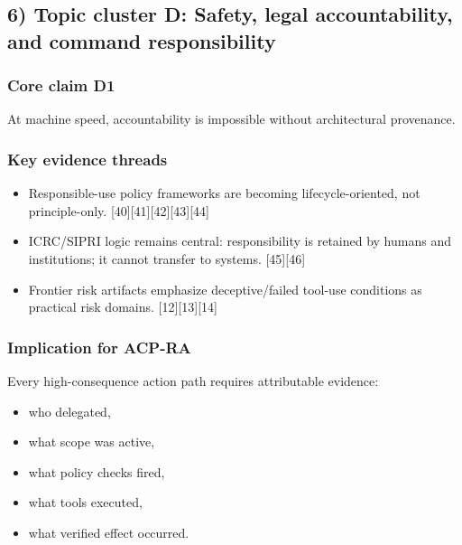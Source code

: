 \documentclass[11pt]{article}
\begin{document}
\hypertarget{topic-cluster-d-safety-legal-accountability-and-command-responsibility}{%
\subsection{6) Topic cluster D: Safety, legal accountability, and
command
responsibility}\label{topic-cluster-d-safety-legal-accountability-and-command-responsibility}}

\hypertarget{core-claim-d1}{%
\subsubsection{Core claim D1}\label{core-claim-d1}}

At machine speed, accountability is impossible without architectural
provenance.

\hypertarget{key-evidence-threads-3}{%
\subsubsection{Key evidence threads}\label{key-evidence-threads-3}}

\begin{itemize}
\tightlist
\item
  Responsible-use policy frameworks are becoming lifecycle-oriented, not
  principle-only. {[}40{]}{[}41{]}{[}42{]}{[}43{]}{[}44{]}
\item
  ICRC/SIPRI logic remains central: responsibility is retained by humans
  and institutions; it cannot transfer to systems. {[}45{]}{[}46{]}
\item
  Frontier risk artifacts emphasize deceptive/failed tool-use conditions
  as practical risk domains. {[}12{]}{[}13{]}{[}14{]}
\end{itemize}

\hypertarget{implication-for-acp-ra-3}{%
\subsubsection{Implication for ACP-RA}\label{implication-for-acp-ra-3}}

Every high-consequence action path requires attributable evidence:

\begin{itemize}
\tightlist
\item
  who delegated,
\item
  what scope was active,
\item
  what policy checks fired,
\item
  what tools executed,
\item
  what verified effect occurred.
\end{itemize}
\end{document}
